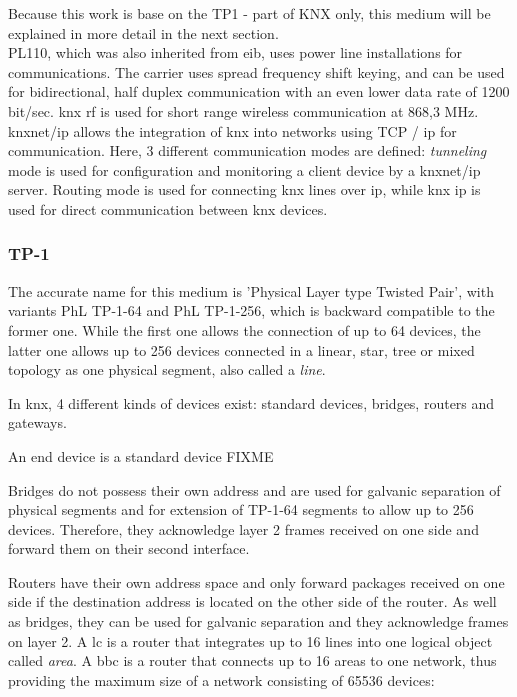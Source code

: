 Because this work is base on the \gls{TP}1 - part of KNX only, this medium will be explained in more detail in the next section.
\\

PL110, which was also inherited from \gls{eib}, uses power line installations for communications. The carrier uses spread frequency shift keying, and can be used 
for bidirectional, half duplex  communication with an even lower data rate of 1200 bit/sec. \gls{knx} \gls{rf} is used for short range wireless communication
at 868,3 MHz. \gls{knx}net/\gls{ip} allows the integration of \gls{knx} into networks using \gls{TCP} / \gls{ip} for communication. Here, 3 different communication
modes are defined: \textit{tunneling} mode is used for configuration and monitoring a client device by a \gls{knx}net/\gls{ip} server. Routing mode is used
for connecting \gls{knx} lines over \gls{ip}, while \gls{knx} \gls{ip} is used for direct communication between \gls{knx} devices. \cite{KraInnosec2013}

\subsubsection{TP-1}

The accurate name for this medium is 'Physical Layer type Twisted Pair', with variants
PhL \gls{TP}-1-64 and PhL \gls{TP}-1-256, which is backward compatible to the former one. While the first one allows
the connection of up to 64 devices, the latter one allows up to 256 devices connected in a linear, star, tree or
mixed topology as one physical segment, also called a \textit{line}.

In \gls{knx}, 4 different kinds of devices exist: standard devices, bridges, routers and gateways.

An end device is a standard device FIXME

Bridges do not possess their own address and are used for galvanic separation of physical segments and for extension of TP-1-64 segments to allow up to 256 devices.
Therefore, they acknowledge layer 2 frames received on one side and forward them on their second interface. 

Routers have their own address space and only forward packages received on one side if the destination address is located on the other side of the router.
As well as bridges, they can be used for galvanic separation and they acknowledge frames on layer 2.
A \gls{lc} is a router that integrates up to 16 lines into one logical object called \textit{area}. A \gls{bbc} is a router that connects
up to 16 areas to one network, thus providing the maximum size of a network consisting of 65536 devices:

